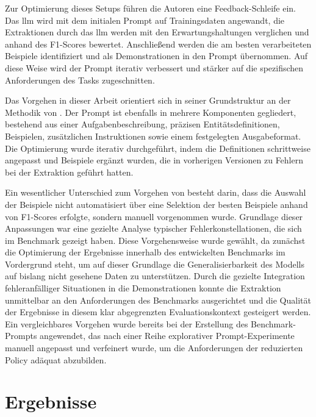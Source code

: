 Zur Optimierung dieses Setups führen die Autoren eine Feedback-Schleife ein.
Das \gls{llm} wird mit dem initialen Prompt auf Trainingsdaten angewandt, die Extraktionen durch das \gls{llm} werden mit den Erwartungshaltungen verglichen und anhand des F1-Scores bewertet.
Anschließend werden die am besten verarbeiteten Beispiele identifiziert und als Demonstrationen in den Prompt übernommen.
Auf diese Weise wird der Prompt iterativ verbessert und stärker auf die spezifischen Anforderungen des Tasks zugeschnitten\autocite{cheng_novel_2024}.

Das Vorgehen in dieser Arbeit orientiert sich in seiner Grundstruktur an der Methodik von \citeauthor{cheng_novel_2024}.
Der Prompt ist ebenfalls in mehrere Komponenten gegliedert, bestehend aus einer Aufgabenbeschreibung, präzisen Entitätsdefinitionen, Beispielen, zusätzlichen Instruktionen sowie einem festgelegten Ausgabeformat.
Die Optimierung wurde iterativ durchgeführt, indem die Definitionen schrittweise angepasst und Beispiele ergänzt wurden, die in vorherigen Versionen zu Fehlern bei der Extraktion geführt hatten.

Ein wesentlicher Unterschied zum Vorgehen von \citeauthor{cheng_novel_2024} besteht darin, dass die Auswahl der Beispiele nicht automatisiert über eine Selektion der besten Beispiele anhand von F1-Scores erfolgte, sondern manuell vorgenommen wurde.
Grundlage dieser Anpassungen war eine gezielte Analyse typischer Fehlerkonstellationen, die sich im Benchmark gezeigt haben.
Diese Vorgehensweise wurde gewählt, da zunächst die Optimierung der Ergebnisse innerhalb des entwickelten Benchmarks im Vordergrund steht, um auf dieser Grundlage die Generalisierbarkeit des Modells auf bislang nicht gesehene Daten zu unterstützen.
Durch die gezielte Integration fehleranfälliger Situationen in die Demonstrationen konnte die Extraktion unmittelbar an den Anforderungen des Benchmarks ausgerichtet und die Qualität der Ergebnisse in diesem klar abgegrenzten Evaluationskontext gesteigert werden.
Ein vergleichbares Vorgehen wurde bereits bei der Erstellung des Benchmark-Prompts angewendet, das nach einer Reihe explorativer Prompt-Experimente manuell angepasst und verfeinert wurde, um die Anforderungen der reduzierten Policy adäquat abzubilden.


\section{Ergebnisse}

